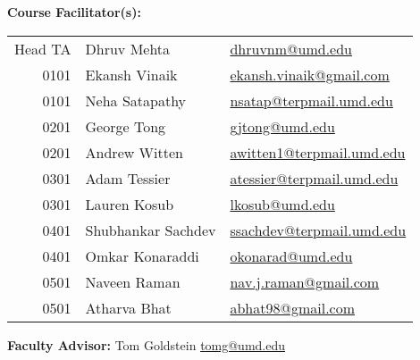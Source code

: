 \documentclass[12pt]{article}
\begin{document}


\medskip

\noindent\textbf{Course Facilitator(s): }

\begin{table}[H]
  \begin{tabular}{@{}rll}
    Head TA & Dhruv Mehta     & \href{mailto:dhruvnm@umd.edu}{dhruvnm@umd.edu}\\
    0101    & Ekansh Vinaik   & \href{mailto:ekansh.vinaik@gmail.com}{ekansh.vinaik@gmail.com}\\
    0101    & Neha Satapathy  & \href{mailto:nsatap@terpmail.umd.edu}{nsatap@terpmail.umd.edu}\\
    0201    & George Tong     & \href{mailto:gjtong@umd.edu}{gjtong@umd.edu}\\
    0201    & Andrew Witten   & \href{mailto:awitten1@terpmail.umd.edu}{awitten1@terpmail.umd.edu}\\
    0301    & Adam Tessier    & \href{mailto:atessier@terpmail.umd.edu}{atessier@terpmail.umd.edu}\\
    0301    & Lauren Kosub    & \href{mailto:lkosub@umd.edu}{lkosub@umd.edu}\\
    0401    & Shubhankar Sachdev & \href{mailto:ssachdev@terpmail.umd.edu}{ssachdev@terpmail.umd.edu}\\
    0401    & Omkar Konaraddi & \href{mailto:okonarad@umd.edu}{okonarad@umd.edu}\\
    0501    & Naveen Raman    & \href{mailto:nav.j.raman@gmail.com}{nav.j.raman@gmail.com}\\
    0501    & Atharva Bhat    & \href{mailto:abhat98@gmail.com}{abhat98@gmail.com}\\
  \end{tabular}
\end{table}
\medskip

\noindent\textbf{Faculty Advisor: }Tom Goldstein
\href{mailto:tomg@umd.edu}{tomg@umd.edu} \medskip
\end{document}
